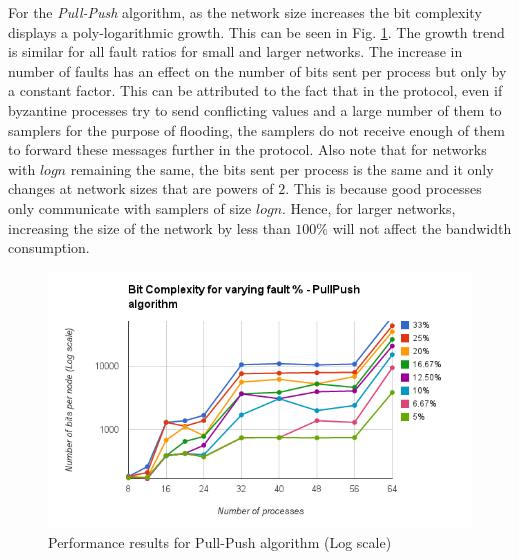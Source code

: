 For the \textit{Pull-Push} algorithm, as the network size increases the bit complexity displays a poly-logarithmic growth. This can be seen in Fig. \ref{fig:pull_push}. The growth trend is similar for all fault ratios for small and larger networks. The increase in number of faults has an effect on the number of bits sent per process but only by a constant factor. This can be attributed to the fact that in the protocol, even if byzantine processes try to send conflicting values and a large number of them to samplers for the purpose of flooding, the samplers do not receive enough of them to forward these messages further in the protocol. Also note that for networks with $logn$ remaining the same, the bits sent per process is the same and it only changes at network sizes that are powers of $2$. This is because good processes only communicate with samplers of size $logn$. Hence, for larger networks, increasing the size of the network by less than $100\%$ will not affect the bandwidth consumption.
\begin{figure}[ht]
 \centering
\includegraphics[scale=0.4]{pull_push}
\caption{Performance results for Pull-Push algorithm (Log scale)}
 \label{fig:pull_push}
\vspace{-2mm}
\end{figure}


